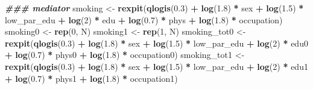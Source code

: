 \documentclass[
]{book}
\newenvironment{Shaded}{\begin{snugshade}}{\end{snugshade}}
\newcommand{\DecValTok}[1]{\textcolor[rgb]{0.00,0.00,0.81}{#1}}
\newcommand{\DocumentationTok}[1]{\textcolor[rgb]{0.56,0.35,0.01}{\textbf{\textit{#1}}}}
\newcommand{\FloatTok}[1]{\textcolor[rgb]{0.00,0.00,0.81}{#1}}
\newcommand{\FunctionTok}[1]{\textcolor[rgb]{0.13,0.29,0.53}{\textbf{#1}}}
\newcommand{\NormalTok}[1]{#1}
\newcommand{\OtherTok}[1]{\textcolor[rgb]{0.56,0.35,0.01}{#1}}
\newcommand{\SpecialCharTok}[1]{\textcolor[rgb]{0.81,0.36,0.00}{\textbf{#1}}}
\begin{document}
\begin{Shaded}
\begin{Highlighting}[]
  \DocumentationTok{\#\#\# mediator}
\NormalTok{  smoking }\OtherTok{\textless{}{-}} \FunctionTok{rexpit}\NormalTok{(}\FunctionTok{qlogis}\NormalTok{(}\FloatTok{0.3}\NormalTok{) }\SpecialCharTok{+} \FunctionTok{log}\NormalTok{(}\FloatTok{1.8}\NormalTok{) }\SpecialCharTok{*}\NormalTok{ sex  }\SpecialCharTok{+} \FunctionTok{log}\NormalTok{(}\FloatTok{1.5}\NormalTok{) }\SpecialCharTok{*}\NormalTok{ low\_par\_edu }\SpecialCharTok{+} 
                      \FunctionTok{log}\NormalTok{(}\DecValTok{2}\NormalTok{) }\SpecialCharTok{*}\NormalTok{ edu }\SpecialCharTok{+} \FunctionTok{log}\NormalTok{(}\FloatTok{0.7}\NormalTok{) }\SpecialCharTok{*}\NormalTok{ phys }\SpecialCharTok{+} \FunctionTok{log}\NormalTok{(}\FloatTok{1.8}\NormalTok{) }\SpecialCharTok{*}\NormalTok{ occupation) }
\NormalTok{  smoking0 }\OtherTok{\textless{}{-}} \FunctionTok{rep}\NormalTok{(}\DecValTok{0}\NormalTok{, N)}
\NormalTok{  smoking1 }\OtherTok{\textless{}{-}} \FunctionTok{rep}\NormalTok{(}\DecValTok{1}\NormalTok{, N)}
\NormalTok{  smoking\_tot0 }\OtherTok{\textless{}{-}} \FunctionTok{rexpit}\NormalTok{(}\FunctionTok{qlogis}\NormalTok{(}\FloatTok{0.3}\NormalTok{) }\SpecialCharTok{+} \FunctionTok{log}\NormalTok{(}\FloatTok{1.8}\NormalTok{) }\SpecialCharTok{*}\NormalTok{ sex  }\SpecialCharTok{+} \FunctionTok{log}\NormalTok{(}\FloatTok{1.5}\NormalTok{) }\SpecialCharTok{*}\NormalTok{ low\_par\_edu }\SpecialCharTok{+} 
                           \FunctionTok{log}\NormalTok{(}\DecValTok{2}\NormalTok{) }\SpecialCharTok{*}\NormalTok{ edu0 }\SpecialCharTok{+} \FunctionTok{log}\NormalTok{(}\FloatTok{0.7}\NormalTok{) }\SpecialCharTok{*}\NormalTok{ phys0 }\SpecialCharTok{+} \FunctionTok{log}\NormalTok{(}\FloatTok{1.8}\NormalTok{) }\SpecialCharTok{*}\NormalTok{ occupation0) }
\NormalTok{  smoking\_tot1 }\OtherTok{\textless{}{-}} \FunctionTok{rexpit}\NormalTok{(}\FunctionTok{qlogis}\NormalTok{(}\FloatTok{0.3}\NormalTok{) }\SpecialCharTok{+} \FunctionTok{log}\NormalTok{(}\FloatTok{1.8}\NormalTok{) }\SpecialCharTok{*}\NormalTok{ sex  }\SpecialCharTok{+} \FunctionTok{log}\NormalTok{(}\FloatTok{1.5}\NormalTok{) }\SpecialCharTok{*}\NormalTok{ low\_par\_edu }\SpecialCharTok{+} 
                           \FunctionTok{log}\NormalTok{(}\DecValTok{2}\NormalTok{) }\SpecialCharTok{*}\NormalTok{ edu1 }\SpecialCharTok{+} \FunctionTok{log}\NormalTok{(}\FloatTok{0.7}\NormalTok{) }\SpecialCharTok{*}\NormalTok{ phys1 }\SpecialCharTok{+} \FunctionTok{log}\NormalTok{(}\FloatTok{1.8}\NormalTok{) }\SpecialCharTok{*}\NormalTok{ occupation1) }
                     

\end{Highlighting}
\end{Shaded}
\end{document}
